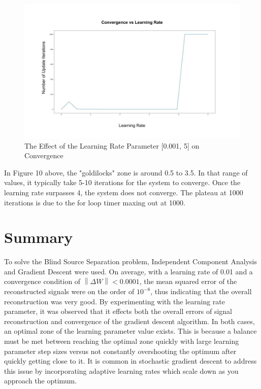 \documentclass[12pt]{article}
\begin{document}
\begin{figure}[!htb] %
  \centering
  \includegraphics[width = \linewidth]{Conv.jpg}
  \caption{The Effect of the Learning Rate Parameter [0.001, 5] on Convergence}
\end{figure}
\FloatBarrier
\bigbreak
\noindent
In Figure 10 above, the "goldilocks" zone is around 0.5 to 3.5. In that range of values, it typically take 5-10 iterations for the system to converge. Once the learning rate surpasses 4, the system does not converge. The plateau at 1000 iterations is due to the for loop timer maxing out at 1000.
\section{Summary}
To solve the Blind Source Separation problem, Independent Component Analysis and Gradient Descent were used. On average, with a learning rate of 0.01 and a convergence condition of \(\left \| \Delta W \right \| < 0.0001\), the mean squared error of the reconstructed signals were on the order of \(10^{-8}\), thus indicating that the overall reconstruction was very good. 
\bigbreak
\noindent
By experimenting with the learning rate parameter, it was observed that it effects both the overall errors of signal reconstruction and convergence of the gradient descent algorithm. In both cases, an optimal zone of the learning parameter value exists. This is because a balance must be met between reaching the optimal zone quickly with large learning parameter step sizes versus not constantly overshooting the optimum after quickly getting close to it. It is common in stochastic gradient descent to address this issue by incorporating adaptive learning rates which scale down as you approach the optimum. 
\end{document}
